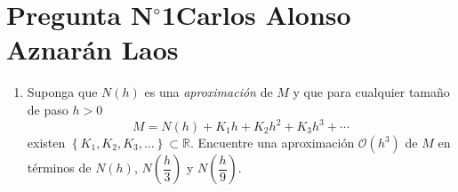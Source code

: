 \section{Pregunta N$^{\circ}$1\qquad Carlos Alonso Aznarán Laos}



\begin{frame}
    \begin{enumerate}\setcounter{enumi}{0}
        \item

              Suponga que $N\left(h\right)$ es una \emph{aproximación}
              de $M$ y que para cualquier tamaño de paso $h>0$
              \begin{equation}\label{eq:richardson}
                  M=
                  N\left(h\right)+
                  K_{1}h+
                  K_{2}h^{2}+
                  K_{3}h^{3}+
                  \cdots
              \end{equation}
              existen
              \begin{math}
                  \left\{
                  K_{1},
                  K_{2},
                  K_{3},
                  \dotsc
                  \right\}\subset
                  \mathbb{R}
              \end{math}.
              Encuentre una aproximación
              $\mathcal{O}\left(h^3\right)$ de $M$ en términos de
              \begin{math}
                  N\left(h\right)
              \end{math},
              \begin{math}
                  N\left(\dfrac{h}{3}\right)
              \end{math}
              y
              \begin{math}
                  N\left(\dfrac{h}{9}\right)
              \end{math}.
    \end{enumerate}


\end{frame}
